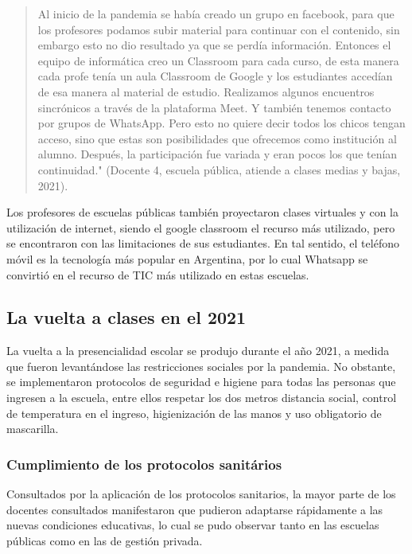 \documentclass[spanish]{textolivre}
\begin{document}
\begin{quote}
    Al inicio de la pandemia se había creado un grupo en facebook, para que los profesores podamos subir material para continuar con el contenido, sin embargo esto no dio resultado ya que se perdía información. Entonces el equipo de informática creo un Classroom para cada curso, de esta manera cada profe tenía un aula Classroom de Google y los estudiantes accedían de esa manera al material de estudio. Realizamos algunos encuentros sincrónicos a través de la plataforma Meet. Y también tenemos contacto por grupos de WhatsApp.  Pero esto no quiere decir todos los chicos tengan acceso, sino que estas son posibilidades que ofrecemos como institución al alumno. Después, la participación fue variada y eran pocos los que tenían continuidad." (Docente 4, escuela pública, atiende a clases medias y bajas, 2021).
\end{quote}

Los profesores de escuelas públicas también proyectaron clases virtuales y con la utilización de internet, siendo el google classroom el recurso más utilizado, pero se encontraron con las limitaciones de sus estudiantes. En tal sentido, el teléfono móvil es la tecnología más popular en Argentina, por lo cual Whatsapp se convirtió en el recurso de TIC más utilizado en estas escuelas.

\subsection{La vuelta a clases en el 2021}\label{sec-autores}
La vuelta a la presencialidad escolar se produjo durante el año 2021, a medida que fueron levantándose las restricciones sociales por la pandemia. No obstante, se implementaron protocolos de seguridad e higiene para todas las personas que ingresen a la escuela, entre ellos respetar los dos metros distancia social, control de temperatura en el ingreso, higienización de las manos y uso obligatorio de mascarilla.

\subsubsection{Cumplimiento de los protocolos sanitários}\label{sec-idioma}
Consultados por la aplicación de los protocolos sanitarios, la mayor parte de los docentes consultados manifestaron que pudieron adaptarse rápidamente a las nuevas condiciones educativas, lo cual se pudo observar tanto en las escuelas públicas como en las de gestión privada.
\end{document}
